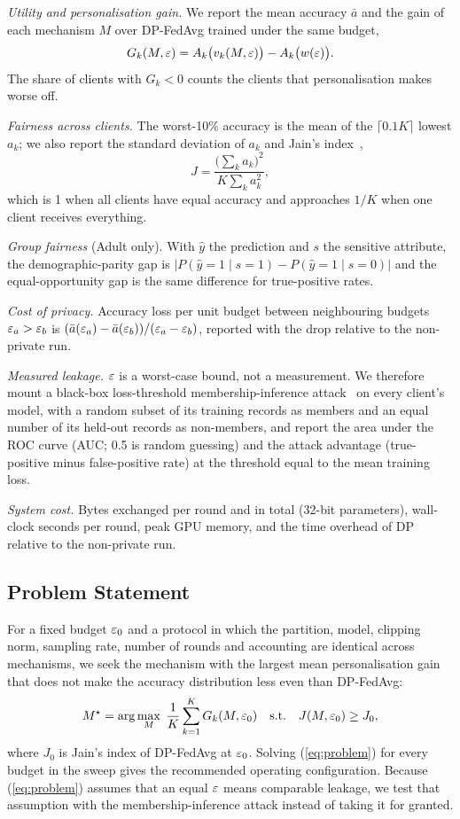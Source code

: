 \emph{Utility and personalisation gain.} We report the mean accuracy $\bar a$ and the gain of each mechanism $M$ over
DP-FedAvg trained under the same budget,
\begin{equation}
G_k(M,\varepsilon)=A_k\big(v_k(M,\varepsilon)\big)-A_k\big(w(\varepsilon)\big). \label{eq:gain}
\end{equation}
The share of clients with $G_k<0$ counts the clients that personalisation makes worse off.

\emph{Fairness across clients.} The worst-10\% accuracy is the mean of the $\lceil 0.1K\rceil$ lowest $a_k$; we also
report the standard deviation of $a_k$ and Jain's index~\cite{jain1984quantitative},
\begin{equation}
J=\frac{\big(\sum_{k}a_k\big)^2}{K\sum_{k}a_k^2}, \label{eq:jain}
\end{equation}
which is 1 when all clients have equal accuracy and approaches $1/K$ when one client receives everything.

\emph{Group fairness} (Adult only). With $\hat y$ the prediction and $s$ the sensitive attribute, the
demographic-parity gap is $\lvert P(\hat y{=}1\mid s{=}1)-P(\hat y{=}1\mid s{=}0)\rvert$ and the equal-opportunity gap
is the same difference for true-positive rates.

\emph{Cost of privacy.} Accuracy loss per unit budget between neighbouring budgets $\varepsilon_a>\varepsilon_b$ is
$(\bar a(\varepsilon_a)-\bar a(\varepsilon_b))/(\varepsilon_a-\varepsilon_b)$, reported with the drop relative to the non-private run.

\emph{Measured leakage.} $\varepsilon$ is a worst-case bound, not a measurement. We therefore mount a black-box
loss-threshold membership-inference attack~\cite{yeom2018privacy} on every client's model, with a random subset of
its training records as members and an equal number of its held-out records as non-members, and report the area
under the ROC curve (AUC; 0.5 is random guessing) and the attack advantage (true-positive minus false-positive rate)
at the threshold equal to the mean training loss.

\emph{System cost.} Bytes exchanged per round and in total (32-bit parameters), wall-clock seconds per round, peak
GPU memory, and the time overhead of DP relative to the non-private run.

\subsection{Problem Statement}
For a fixed budget $\varepsilon_0$ and a protocol in which the partition, model, clipping norm, sampling rate, number of
rounds and accounting are identical across mechanisms, we seek the mechanism with the largest mean personalisation
gain that does not make the accuracy distribution less even than DP-FedAvg:
\begin{equation}
M^\star=\arg\max_{M}\;\frac{1}{K}\sum_{k=1}^{K}G_k(M,\varepsilon_0)\quad\text{s.t.}\quad J(M,\varepsilon_0)\ge J_0,
\label{eq:problem}
\end{equation}
where $J_0$ is Jain's index of DP-FedAvg at $\varepsilon_0$. Solving (\ref{eq:problem}) for every budget in the sweep gives
the recommended operating configuration. Because (\ref{eq:problem}) assumes that an equal $\varepsilon$ means comparable
leakage, we test that assumption with the membership-inference attack instead of taking it for granted.
